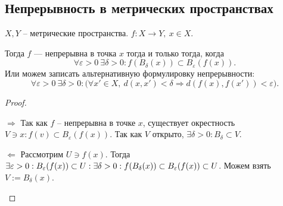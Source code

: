\documentclass[11pt]{book}
\theoremstyle{definition}
\theoremstyle{plain}
\theoremstyle{plain}
\theoremstyle{definition}
\theoremstyle{remark}
\begin{document}
\subsection{Непрерывность в метрических пространствах}
\begin{thm}
    $X, Y$ -- метрические пространства.  $f: X \to  Y, ~ x \in  X$.

    Тогда $f$ --- непрерывна в точка $x$ тогда и только тогда, когда
    \[
	\forall  \varepsilon >0 ~ \exists  \delta  >0: f(B_{ \delta }(x)) \subset B_{ \varepsilon } (f(x))
    .\]
    Или можем записать альтернативную формулировку непрерывности:
    \[
	\forall  \varepsilon >0 ~\exists \delta >0: \bigl(\forall x' \in  X ,~  d(x, x') < \delta \Longrightarrow   d(f(x) , f(x')) < \varepsilon\bigr)
    .\]
\end{thm}
\begin{proof}
    $ $
    \begin{description}
	\item $ \boxed{ \Longrightarrow }$ Так как $f$ -- непрерывна в точке $x$, существует окрестность $V \ni x: f(v) \subset  B_{ \varepsilon }(f(x))$. Так как $V$ открыто, $\exists  \delta >0 : B_{ \delta } \subset  V$.
	\item $ \boxed{ \Longleftarrow }$ 
     Рассмотрим $U \ni f(x)$.
    Тогда $\exists  \varepsilon >0: B_{ \varepsilon }(f(x)) \subset U: \\
    \exists \delta  >0 : f(B_{\delta}(x)) \subset  B_{ \varepsilon } (f(x)) \subset  U$.
    Можем взять  $V:=B_{ \delta } (x)$.
    \end{description}
\end{proof}
\end{document}
